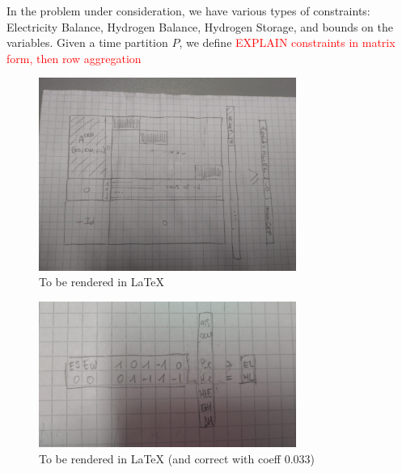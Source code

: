 In the problem under consideration, we have various types of constraints: Electricity Balance, Hydrogen Balance, Hydrogen Storage, and bounds on the variables. 
Given a time partition \(P\), we define \textcolor{red}{EXPLAIN constraints in matrix form, then row aggregation}%

\begin{figure}
    \includegraphics[width=0.75\textwidth]{constraint_matrix.jpeg}
  \caption{To be rendered in LaTeX}
  \end{figure}

 
\begin{figure}
    \includegraphics[width=0.75\textwidth]{single_block.jpeg}
  \caption{To be rendered in LaTeX (and correct with coeff 0.033)}
  \end{figure} 









